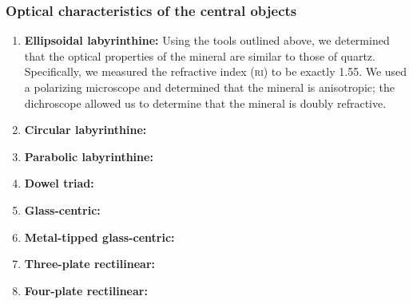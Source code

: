 \documentclass[10pt]{article}
\theoremstyle{definition}
\begin{document}
\subsubsection{Optical characteristics of the central objects}
\begin{enumerate}[(001)]
\item \textbf{Ellipsoidal labyrinthine:} Using the tools outlined above, we determined that the optical properties of the mineral are similar to those of quartz.
    Specifically, we measured the refractive index (\textsc{ri}) to be exactly 1.55.
    We used a polarizing microscope and determined that the mineral is anisotropic; the dichroscope allowed us to determine that the mineral is doubly refractive.
\item \textbf{Circular labyrinthine:}
\item \textbf{Parabolic labyrinthine:}
\item \textbf{Dowel triad:}
\item \textbf{Glass-centric:}
\item \textbf{Metal-tipped glass-centric:}
\item \textbf{Three-plate rectilinear:}
\item \textbf{Four-plate rectilinear:}
\end{enumerate}
\end{document}
